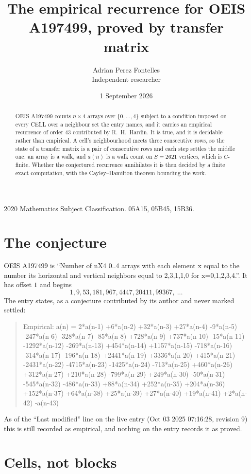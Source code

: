 \documentclass[11pt,a4paper]{article}
\title{The empirical recurrence for OEIS A197499, proved by transfer matrix}
\author{Adrian Perez Fontelles\\ \small Independent researcher}
\date{1 September 2026}
\theoremstyle{plain}
\theoremstyle{definition}
\begin{document}
\maketitle

\begin{abstract}
OEIS A197499 counts $n\times4$ arrays over $\{0,\dots,4\}$ subject to a condition imposed on
every CELL over a neighbour set the entry names, and it carries an empirical recurrence of
order $43$ contributed by R.~H.~Hardin. It is true, and it is decidable rather than
empirical. A cell's neighbourhood meets three consecutive rows, so the state of a transfer
matrix is a pair of consecutive rows and each step settles the middle one; an array is a
walk, and $a(n)$ is a walk count on $S=2621$ vertices, which is $C$-finite. Whether the
conjectured recurrence annihilates it is then decided by a finite exact computation, with the
Cayley--Hamilton theorem bounding the work.
\end{abstract}

\noindent\small 2020 Mathematics Subject Classification. 05A15, 05B45, 15B36.\normalsize

\section{The conjecture}

OEIS A197499 is ``Number of nX4 0..4 arrays with each element x equal to the number its horizontal and vertical neighbors equal to 2,3,1,1,0 for x=0,1,2,3,4.''. It has offset $1$ and begins
\[
1, 9, 53, 181, 967, 4447, 20411, 99367,\ \dots
\]
The entry states, as a conjecture contributed by its author and never marked settled:
\begin{quote}
Empirical: a(n) = 2*a(n-1) +6*a(n-2) +32*a(n-3) +27*a(n-4) -9*a(n-5) -247*a(n-6) -328*a(n-7) -85*a(n-8) +728*a(n-9) +737*a(n-10) -15*a(n-11) -1292*a(n-12) -269*a(n-13) +454*a(n-14) +1157*a(n-15) -718*a(n-16) -314*a(n-17) -196*a(n-18) +2441*a(n-19) +3336*a(n-20) +415*a(n-21) -2431*a(n-22) -4715*a(n-23) -1425*a(n-24) -713*a(n-25) +460*a(n-26) +312*a(n-27) +210*a(n-28) -799*a(n-29) +249*a(n-30) -50*a(n-31) -545*a(n-32) -486*a(n-33) +88*a(n-34) +252*a(n-35) +204*a(n-36) +152*a(n-37) +64*a(n-38) +25*a(n-39) +27*a(n-40) +19*a(n-41) +2*a(n-42) -a(n-43)
\end{quote}
As of the ``Last modified'' line on the live entry (Oct 03 2025 07:16:28, revision 9) this is still
recorded as empirical, and nothing on the entry records it as proved.

\section{Cells, not blocks}
\end{document}
